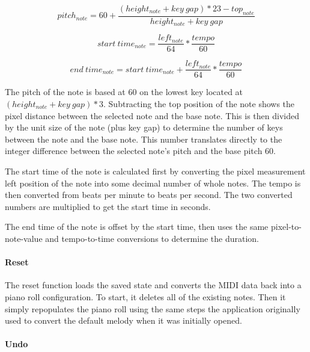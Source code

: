 \begin{equation} \label{get_pitch}
  pitch_{note} = 60 + \frac{(height_{note} + key\:gap) * 23 - top_{note}}{height_{note} + key\:gap}
\end{equation}

\begin{equation} \label{get_start}
  start\:time_{note} = \frac{left_{note}}{64} * \frac{tempo}{60}
\end{equation}

\begin{equation} \label{get_end}
  end\:time_{note} = start\:time_{note} + \frac{left_{note}}{64} * \frac{tempo}{60}
\end{equation}

The pitch of the note is based at 60 on the lowest key located at
$ (height_{note} +key\:gap) * 3 $. Subtracting the top position of the note shows the pixel
distance between the selected note and the base note. This is then divided by the unit size of the
note (plus key gap) to determine the number of keys between the note and the base note. This number
translates directly to the integer difference between the selected note’s pitch and the base pitch
60.

The start time of the note is calculated first by converting the pixel measurement left position
of the note into some decimal number of whole notes. The tempo is then converted from beats per
minute to beats per second. The two converted numbers are multiplied to get the start time in
seconds.

The end time of the note is offset by the start time, then uses the same pixel-to-note-value and
tempo-to-time conversions to determine the duration.

\paragraph{Reset}

The reset function loads the saved state and converts the MIDI data back into a piano roll
configuration. To start, it deletes all of the existing notes. Then it simply repopulates the piano
roll using the same steps the application originally used to convert the default melody when it was
initially opened.

\paragraph{Undo}

